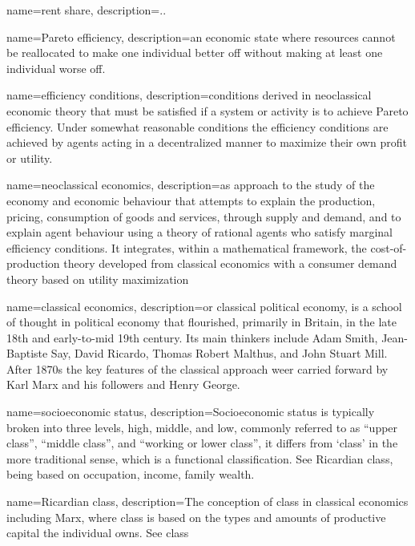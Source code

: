 {
name=rent share,
description={..}
}

{
name=Pareto efficiency,
description={an economic state where resources cannot be reallocated to make one individual better off without making at least one individual worse off.}
}

{
name=efficiency conditions,
description={conditions derived in neoclassical economic theory that must be satisfied if a system or activity is to achieve Pareto efficiency. Under somewhat reasonable conditions the efficiency conditions are achieved by agents acting in a decentralized manner to maximize their own profit or utility.}
}

{
name=neoclassical economics,
description={as approach to the study of the economy and economic behaviour that attempts to explain the production, pricing, consumption of goods and services,  through supply and demand, and to explain agent behaviour using a theory of rational agents who satisfy \gls{marginal} efficiency conditions. It integrates, within a mathematical framework, the cost-of-production theory  developed from \gls{classical economics} with a consumer demand theory based on utility maximization   }
}

{
name=classical economics,
description={or classical political economy, is a school of thought in political economy that flourished, primarily in Britain, in the late 18th and early-to-mid 19th century. Its main thinkers include Adam Smith, Jean-Baptiste Say, David Ricardo, Thomas Robert Malthus, and John Stuart Mill. After 1870s the key features of the classical approach weer carried forward by  Karl Marx and his followers and  Henry George.  }
}

{
name=socioeconomic status,
description={Socioeconomic status is typically broken into three levels, high, middle, and low,  commonly referred to as ``upper class'', ``middle class'', and ``working or lower class'', it differs from `\gls{class}' in the more traditional sense, which is a functional classification. See \gls{Ricardian class}, being based on occupation, income, family wealth.   }
}

{
name=Ricardian class,
description={The conception of class in \gls{classical economics} including Marx, where class is based on the types and amounts of productive capital the individual owns. See \gls{class}}
}

